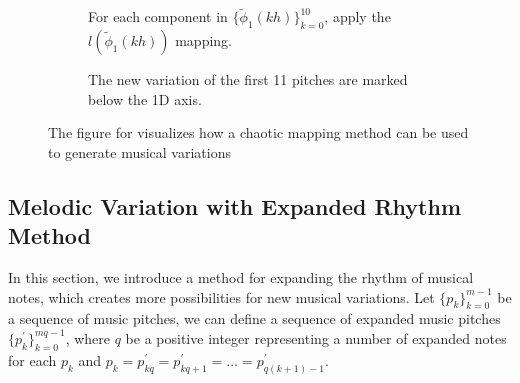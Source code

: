 \documentclass[11pt]{article}
\theoremstyle{definition}
\begin{document}
\begin{figure}
\begin{subfigure}{\textwidth}
  \caption{For each component in $\{\tilde{\phi}_1(kh)\}_{k=0}^{10}$, apply the $l(\tilde{\phi}_1(kh))$ mapping.}
  \label{subfig:traj2nmp}

\end{subfigure}

\vspace{5pt}

\begin{subfigure}{\textwidth}
  \centering
  \caption{The new variation of the first 11 pitches are marked below the 1D axis.}
  \label{subfig:nmp}

\end{subfigure}

\caption{The figure for visualizes how a chaotic mapping method can be used to generate musical variations}
\label{fig:dabby method}
\end{figure}

\subsection{Melodic Variation with Expanded Rhythm Method} 
\label{subsec: melodicvariationwithexpandedrhythm}
In this section, we introduce a method for expanding the rhythm of musical notes, which creates more possibilities for new musical variations. Let $\{p_k\}_{k=0}^{m-1}$ be a sequence of music pitches, we can define a sequence of expanded music pitches $\{p^\prime_k\}_{k=0}^{mq-1}$, where $q$ be a positive integer representing a number of expanded notes for each $p_k$ and $p_k = p^\prime_{kq} = p^\prime_{kq + 1} = \dots = p^\prime_{q(k + 1) - 1}$.
\end{document}
